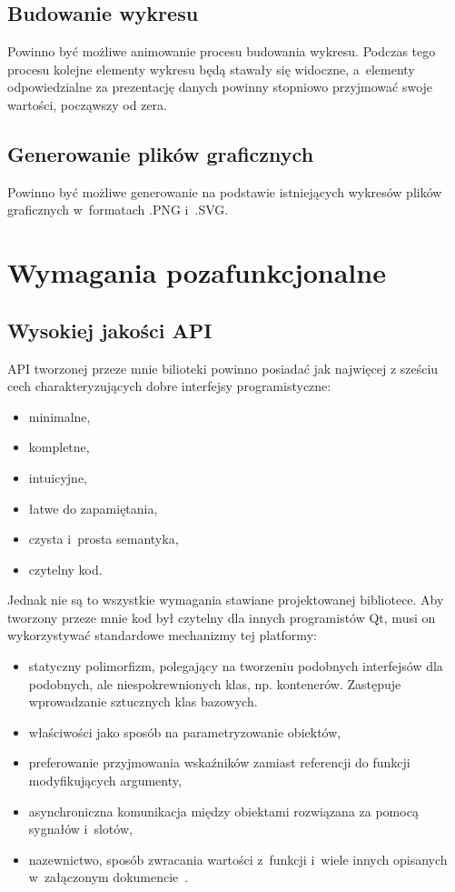 \subsection{Budowanie wykresu}
Powinno być możliwe animowanie procesu budowania wykresu. Podczas tego procesu kolejne elementy wykresu będą stawały się widoczne, a~elementy odpowiedzialne za prezentację danych powinny stopniowo przyjmować swoje wartości, począwszy od zera.

\subsection{Generowanie plików graficznych}
Powinno być możliwe generowanie na podstawie istniejących wykresów plików graficznych  w~formatach .PNG i~.SVG.


\section{Wymagania pozafunkcjonalne}
\subsection{Wysokiej jakości API}
API tworzonej przeze mnie bilioteki powinno posiadać jak najwięcej z sześciu cech charakteryzujących dobre interfejsy programistyczne:
\begin{itemize}
\item{minimalne,}
\item{kompletne,}
\item{intuicyjne,} 
\item{łatwe do zapamiętania,}
\item{czysta i~prosta semantyka,}
\item{czytelny kod.}
\end{itemize}

Jednak nie są to wszystkie wymagania stawiane projektowanej bibliotece. Aby tworzony przeze mnie kod był czytelny dla innych programistów Qt, musi on wykorzystywać standardowe mechanizmy tej platformy:
\begin{itemize}
\item{statyczny polimorfizm, polegający na tworzeniu podobnych interfejsów dla podobnych, ale niespokrewnionych klas, np. kontenerów. Zastępuje wprowadzanie sztucznych klas bazowych.}
\item{właściwości jako sposób na parametryzowanie obiektów,}
\item{preferowanie przyjmowania wskaźników zamiast referencji do funkcji modyfikujących argumenty,}
\item{asynchroniczna komunikacja między obiektami rozwiązana za pomocą sygnałów i~slotów,}
\item{nazewnictwo, sposób zwracania wartości z~funkcji i~wiele innych opisanych w~załączonym dokumencie~\cite{APIDesign}.}
\end{itemize}

